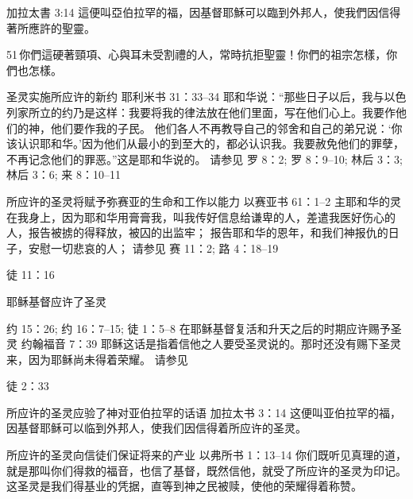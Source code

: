 




加拉太書 3:14
這便叫亞伯拉罕的福，因基督耶穌可以臨到外邦人，使我們因信得著所應許的聖靈。

 51 你們這硬著頸項、心與耳未受割禮的人，常時抗拒聖靈！你們的祖宗怎樣，你們也怎樣。 






圣灵实施所应许的新约
耶利米书 31：33–34 耶和华说：“那些日子以后，我与以色列家所立的约乃是这样：我要将我的律法放在他们里面，写在他们心上。我要作他们的神，他们要作我的子民。 他们各人不再教导自己的邻舍和自己的弟兄说：‘你该认识耶和华。’因为他们从最小的到至大的，都必认识我。我要赦免他们的罪孽，不再记念他们的罪恶。”这是耶和华说的。
请参见 
罗 8：2; 
罗 8：9–10; 
林后 3：3; 
林后 3：6; 
来 8：10–11





所应许的圣灵将赋予弥赛亚的生命和工作以能力
以赛亚书 61：1–2 主耶和华的灵在我身上，因为耶和华用膏膏我，叫我传好信息给谦卑的人，差遣我医好伤心的人，报告被掳的得释放，被囚的出监牢； 报告耶和华的恩年，和我们神报仇的日子，安慰一切悲哀的人；
请参见 
赛 11：2; 
路 4：18–19




徒 11：16

耶稣基督应许了圣灵

约 15：26; 
约 16：7–15; 
徒 1：5–8
在耶稣基督复活和升天之后的时期应许赐予圣灵
约翰福音 7：39 耶稣这话是指着信他之人要受圣灵说的。那时还没有赐下圣灵来，因为耶稣尚未得着荣耀。
请参见 

徒 2：33

所应许的圣灵应验了神对亚伯拉罕的话语
加拉太书 3：14 这便叫亚伯拉罕的福，因基督耶稣可以临到外邦人，使我们因信得着所应许的圣灵。

所应许的圣灵向信徒们保证将来的产业
以弗所书 1：13–14 你们既听见真理的道，就是那叫你们得救的福音，也信了基督，既然信他，就受了所应许的圣灵为印记。 这圣灵是我们得基业的凭据，直等到神之民被赎，使他的荣耀得着称赞。



